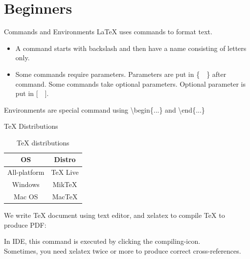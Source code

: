 \documentclass[10pt,t]{beamer}
\begin{document}
\section{Beginners}
\begin{frame}{\TeX{} Source File}
TeX},
    morekeywords={maketitle},keywordstyle=\color{red}]{einstein.tex}
\end{frame}

\begin{frame}{Commands and Environments}
    \LaTeX{} uses commands to format text.
\begin{itemize}
    \item A command starts with backslash and then have a name
        consisting of letters only.
    \item Some commands require parameters. Parameters are put in
        \{\ \ \} after command. Some commands take optional parameters.
        Optional parameter is put in [\ \ ].\\[2ex]

\end{itemize}

    Environments are special command using \textbackslash begin\{...\}
    and \textbackslash end\{...\}

\end{frame}

\begin{frame}{\TeX{} Distributions}
\begin{table}
\centering
    \caption{\TeX{} distributions}
    \begin{tabular}{cc}\hline\hline
        OS          &   Distro\\\hline
        All-platform & TeX Live\\
        Windows    & MikTeX \\
        Mac OS    & MacTeX\\\hline\hline
    \end{tabular}
\end{table}

    We write \TeX{} document using text editor, and \alert{xelatex} to compile
    \TeX{} to produce PDF:\\[2ex]

\begin{center}
\end{center}

In IDE, this command is executed by clicking the compiling-icon.
\\[1ex]
Sometimes, you need \alert{xelatex} twice or more to produce correct
cross-references.
\end{frame}
\end{document}
